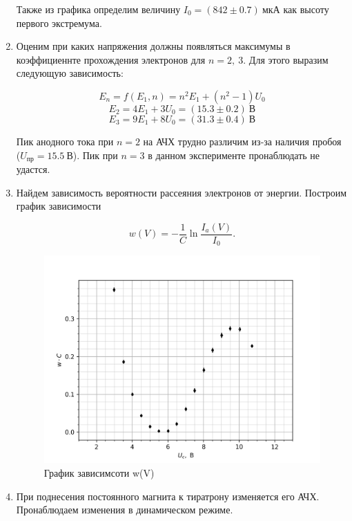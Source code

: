 \documentclass[14pt, a4paper]{report}
\begin{document}
\begin{enumerate}
Также из графика определим величину $I_0=(842\pm0.7)\ мкА$ как высоту первого экстремума.

\item Оценим при каких напряжения должны появляться максимумы в коэффициеннте прохождения электронов для $n=2,\ 3$. Для этого выразим следующую зависимость:

\[E_n=f(E_1, n)=n^2 E_1+(n^2-1) U_0\]
\[E_2=4E_1+3U_0=(15.3\pm0.2)\ В\]
\[E_3=9E_1+8U_0=(31.3\pm0.4)\ В\]

Пик анодного тока при $n=2$ на АЧХ трудно различим из-за наличия пробоя ($U_{пр}=15.5\ В$). Пик при $n=3$ в данном эксперименте пронаблюдать не удастся.

\item Найдем зависимость вероятности рассеяния электронов от энергии. Построим график зависимости

\[w(V)=-\frac{1}{C}\ln{\frac{I_a(V)}{I_0}}\text{.}\]

\begin{figure}[H]
\centering
\includegraphics[scale=0.8]{../images/513-6}
\caption{График зависимсоти w(V)}
\end{figure}

\item При поднесения постоянного магнита к тиратрону изменяется его АЧХ. Пронаблюдаем изменения в динамическом режиме.


\end{enumerate}
\end{document}
